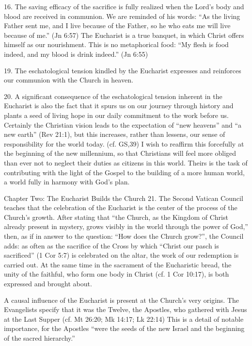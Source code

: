\documentclass[oneside]{book}
\begin{document}
16. The saving efficacy of the sacrifice is fully realized when the Lord's body
and blood are received in communion. We are reminded of his words: ``As the
living Father sent me, and I live because of the Father, so he who eats me will
live because of me.'' (Jn 6:57) The Eucharist is a true banquet, in which Christ
offers himself as our nourishment. This is no metaphorical food: ``My flesh is
food indeed, and my blood is drink indeed.'' (Jn 6:55)

19. The eschatological tension kindled by the Eucharist expresses and reinforces
our communion with the Church in heaven.

20. A significant consequence of the eschatological tension inherent in the
Eucharist is also the fact that it spurs us on our journey through history and
plants a seed of living hope in our daily commitment to the work before
us. Certainly the Christian vision leads to the expectation of ``new heavens''
and ``a new earth'' (Rev 21:1), but this increases, rather than lessens, our
sense of responsibility for the world today. (cf. GS,39)  I wish to reaffirm
this forcefully at the beginning of the new millennium, so that Christians will
feel more obliged than ever not to neglect their duties as citizens in this
world. Theirs is the task of contributing with the light of the Gospel to the
building of a more human world, a world fully in harmony with God's plan.

Chapter Two: The Eucharist Builds the Church
21. The Second Vatican Council teaches that the celebration of the Eucharist is
the center of the process of the Church's growth. After stating that ``the
Church, as the Kingdom of Christ already present in mystery, grows visibly in
the world through the power of God,'' then, as if in answer to the question:
``How does the Church grow?'', the Council adds: as often as the sacrifice of
the Cross by which ``Christ our pasch is sacrificed'' (1 Cor 5:7) is celebrated
on the altar, the work of our redemption is carried out. At the same time in the
sacrament of the Eucharistic bread, the unity of the faithful, who form one body
in Christ (cf. 1 Cor 10:17), is both expressed and brought about.

A causal influence of the Eucharist is present at the Church's very origins. The
Evangelists specify that it was the Twelve, the Apostles, who gathered with
Jesus at the Last Supper (cf. Mt 26:20; Mk 14:17; Lk 22:14) This is a detail of
notable importance, for the Apostles ``were the seeds of the new Israel and the
beginning of the sacred hierarchy.''
\end{document}
